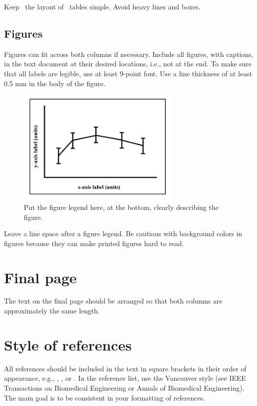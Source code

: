 \documentclass[twocolumn]{cinc}
\begin{document}
Keep \ the layout of \ tables simple. Avoid  heavy lines and boxes.

\subsection{ Figures}   

Figures can fit across both columns if necessary. Include all figures, with
captions, in the text document at their desired locations, i.e., not at the
end. To make sure that all labels are legible, use at least 9-point
font. Use a line thickness of at least 0.5 mm in the body of the figure.

\begin{figure}[h]
\includegraphics[width=7.9cm]{graph.png}
\caption{Put the figure legend here, at the bottom, clearly describing the
  figure.}
\label{FIGURA1}
\end{figure}

Leave a line space after a figure legend. Be cautious with background
colors in figures because they can make printed figures hard to read.

\section{Final page}

The text on the final page should be arranged so that both columns are
approximately the same length.

\balance

\section{Style of references}     

All references should be included in the text in square brackets in their
order of appearance, e.g., \cite{tag}, \cite{tag,ito}, or
\cite{tag,ito,fardel,buncombe}. In the reference list, use the Vancouver
style (see IEEE Transactions on Biomedical Engineering or Annals of
Biomedical Engineering). The main goal is to be consistent in your
formatting of references.
\end{document}
